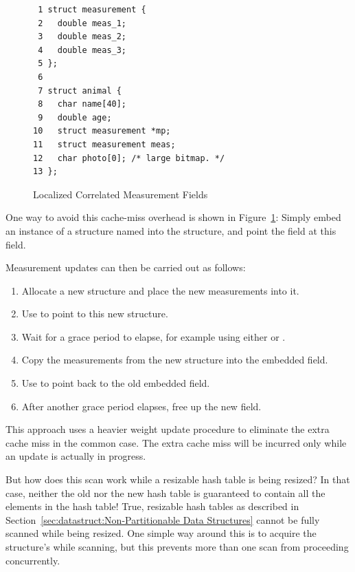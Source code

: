 \begin{figure}[tbp]
{ \scriptsize
\begin{verbatim}
 1 struct measurement {
 2   double meas_1;
 3   double meas_2;
 4   double meas_3;
 5 };
 6 
 7 struct animal {
 8   char name[40];
 9   double age;
10   struct measurement *mp;
11   struct measurement meas;
12   char photo[0]; /* large bitmap. */
13 };
\end{verbatim}
}
\caption{Localized Correlated Measurement Fields}
\label{fig:together:Localized Correlated Measurement Fields}
\end{figure}

	One way to avoid this cache-miss overhead is shown in
	Figure~\ref{fig:together:Localized Correlated Measurement Fields}:
	Simply embed an instance of a  structure
	named 
	into the  structure, and point the 
	field at this  field.

	Measurement updates can then be carried out as follows:

	\begin{enumerate}
	\item	Allocate a new  structure and place
		the new measurements into it.
	\item	Use  to point  to
		this new structure.
	\item	Wait for a grace period to elapse, for example using
		either  or .
	\item	Copy the measurements from the new 
		structure into the embedded  field.
	\item	Use  to point 
		back to the old embedded  field.
	\item	After another grace period elapses, free up the
		new  field.
	\end{enumerate}

	This approach uses a heavier weight update procedure to eliminate
	the extra cache miss in the common case.
	The extra cache miss will be incurred only while an update is
	actually in progress.

\QuickQ{}
	But how does this scan work while a resizable hash table
	is being resized?
	In that case, neither the old nor the new hash table is
	guaranteed to contain all the elements in the hash table!
\QuickA{}
	True, resizable hash tables as described in
	Section~\ref{sec:datastruct:Non-Partitionable Data Structures}
	cannot be fully scanned while being resized.
	One simple way around this is to acquire the
	 structure's  while scanning,
	but this prevents more than one scan from proceeding
	concurrently.

